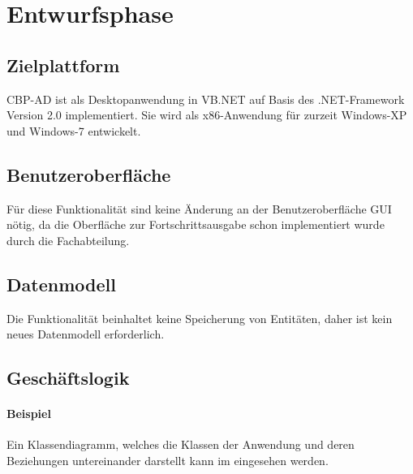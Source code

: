 
\section{Entwurfsphase} 
\label{sec:Entwurfsphase}

\subsection{Zielplattform}
\label{sec:Zielplattform}

\ac{CBP-AD} ist als Desktopanwendung in \acs{VB}.NET auf Basis des .NET-Framework Version 2.0 implementiert.
Sie wird als x86-Anwendung für zurzeit Windows-XP und Windows-7 entwickelt.


\subsection{Benutzeroberfläche}
\label{sec:Benutzeroberflaeche}

Für diese Funktionalität sind keine Änderung an der Benutzeroberfläche \acs{GUI} nötig, da die Oberfläche zur Fortschrittsausgabe schon implementiert wurde durch die Fachabteilung.



\subsection{Datenmodell}
\label{sec:Datenmodell}

Die Funktionalität \gqq{\titel} beinhaltet keine Speicherung von Entitäten, daher ist kein neues Datenmodell erforderlich.


\subsection{Geschäftslogik}
\label{sec:Geschaeftslogik}

\paragraph{Beispiel}
Ein Klassendiagramm, welches die Klassen der Anwendung und deren Beziehungen untereinander darstellt kann im  eingesehen werden.

